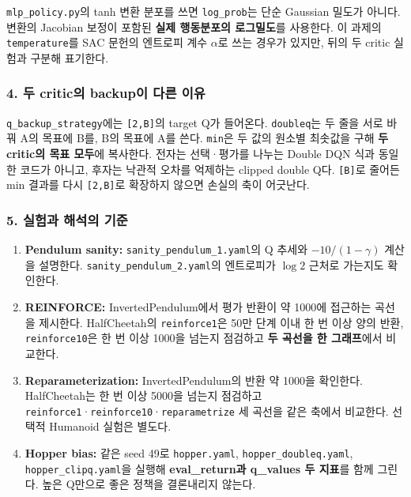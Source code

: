 \documentclass[11pt,a4paper]{article}
\begin{document}
\texttt{mlp\_\allowbreak{}policy.\allowbreak{}py}의 tanh 변환 분포를 쓰면 \texttt{log\_\allowbreak{}prob}는 단순 Gaussian 밀도가 아니다. 변환의 Jacobian 보정이 포함된 \textbf{실제 행동분포의 로그밀도}를 사용한다. 이 과제의 \texttt{temperature}를 SAC 문헌의 엔트로피 계수 $\alpha$로 쓰는 경우가 있지만, 뒤의 두 critic 실험과 구분해 표기한다.\par

\subsubsection{4. 두 critic의 backup이 다른 이유}

\texttt{q\_\allowbreak{}backup\_\allowbreak{}strategy}에는 \texttt{[2,\allowbreak{}B]}의 target Q가 들어온다. \texttt{doubleq}는 두 줄을 서로 바꿔 A의 목표에 B를, B의 목표에 A를 쓴다. \texttt{min}은 두 값의 원소별 최솟값을 구해 \textbf{두 critic의 목표 모두}에 복사한다. 전자는 선택·평가를 나누는 Double DQN 식과 동일한 코드가 아니고, 후자는 낙관적 오차를 억제하는 clipped double Q다. \texttt{[B]}로 줄어든 min 결과를 다시 \texttt{[2,\allowbreak{}B]}로 확장하지 않으면 손실의 축이 어긋난다.\par

\subsubsection{5. 실험과 해석의 기준}

\begin{enumerate}
\item \textbf{Pendulum sanity:} \texttt{sanity\_\allowbreak{}pendulum\_\allowbreak{}1.\allowbreak{}yaml}의 Q 추세와 $-10/(1-\gamma)$ 계산을 설명한다. \texttt{sanity\_\allowbreak{}pendulum\_\allowbreak{}2.\allowbreak{}yaml}의 엔트로피가 $\log2$ 근처로 가는지도 확인한다.
\item \textbf{REINFORCE:} InvertedPendulum에서 평가 반환이 약 1000에 접근하는 곡선을 제시한다. HalfCheetah의 \texttt{reinforce1}은 50만 단계 이내 한 번 이상 양의 반환, \texttt{reinforce10}은 한 번 이상 1000을 넘는지 점검하고 \textbf{두 곡선을 한 그래프}에서 비교한다.
\item \textbf{Reparameterization:} InvertedPendulum의 반환 약 1000을 확인한다. HalfCheetah는 한 번 이상 5000을 넘는지 점검하고 \texttt{reinforce1}·\texttt{reinforce10}·\texttt{reparametrize} 세 곡선을 같은 축에서 비교한다. 선택적 Humanoid 실험은 별도다.
\item \textbf{Hopper bias:} 같은 seed 49로 \texttt{hopper.\allowbreak{}yaml}, \texttt{hopper\_\allowbreak{}doubleq.\allowbreak{}yaml}, \texttt{hopper\_\allowbreak{}clipq.\allowbreak{}yaml}을 실행해 \textbf{eval\_return과 q\_values 두 지표}를 함께 그린다. 높은 Q만으로 좋은 정책을 결론내리지 않는다.
\end{enumerate}
\end{document}
